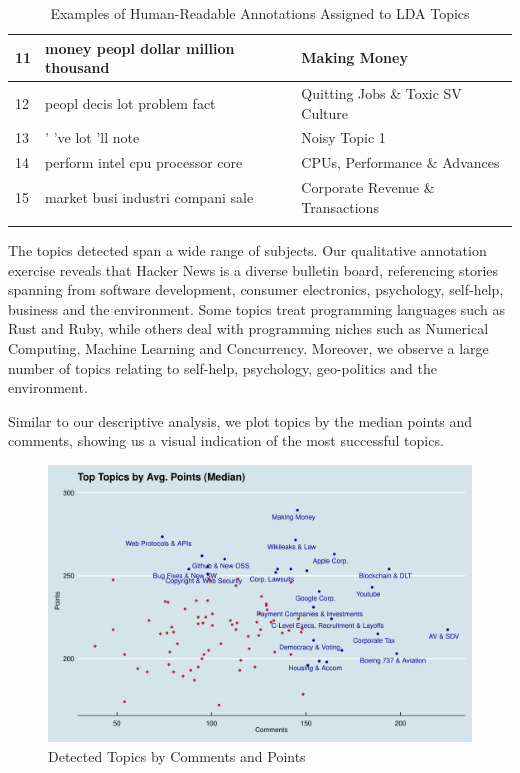 \documentclass[11pt,journal,final,a4paper]{IEEEtran}
\begin{document}
\begin{table}[!ht]
\begin{tabular}{lll}
11                                                 & money peopl dollar million thousand & Making Money                                                        \\ \hline
12                                                 & peopl decis lot problem fact        & Quitting Jobs \& Toxic SV Culture                                   \\ \hline
13                                                 & ’ ’ve lot ’ll note                  & Noisy Topic 1                                                       \\ \hline
14                                                 & perform intel cpu processor core    & CPUs, Performance \& Advances                                       \\ \hline
15                                                 & market busi industri compani sale   & Corporate Revenue \& Transactions                                   \\ \hline
\\
\end{tabular}
\caption{Examples of Human-Readable Annotations Assigned to LDA Topics}
\label{tab:annot-examples}
\end{table}

The topics detected span a wide range of subjects. Our qualitative annotation exercise reveals that Hacker News is a diverse bulletin board, referencing stories spanning from software development, consumer electronics, psychology, self-help, business and the environment. Some topics treat programming languages such as Rust and Ruby, while others deal with programming niches such as Numerical Computing, Machine Learning and Concurrency. Moreover, we observe a large number of topics relating to self-help, psychology, geo-politics and the environment.

Similar to our descriptive analysis, we plot topics by the median points and comments, showing us a visual indication of the most successful topics.

\begin{figure}[!ht]
\centerline{\includegraphics[scale=0.4]{img/topic_model_02_alltopics.png}}
\caption{Detected Topics by Comments and Points}
\label{fig7}
\end{figure}
\end{document}
